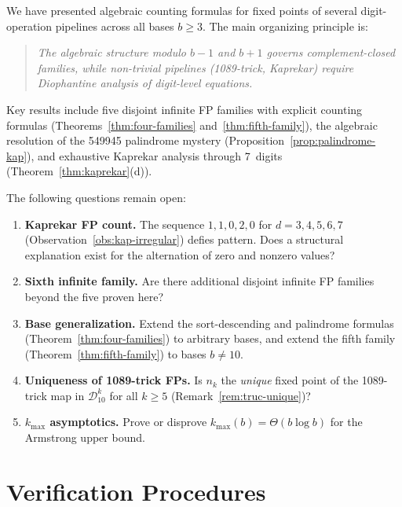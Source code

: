 \documentclass[11pt,a4paper]{amsart}
\theoremstyle{plain}
\theoremstyle{definition}
\theoremstyle{remark}
\begin{document}
We have presented algebraic counting formulas for fixed points of several
digit-operation pipelines across all bases $b \geq 3$. The main organizing
principle is:

\begin{quote}
\emph{The algebraic structure modulo $b{-}1$ and $b{+}1$ governs
complement-closed families, while non-trivial pipelines (1089-trick,
Kaprekar) require Diophantine analysis of digit-level equations.}
\end{quote}

Key results include five disjoint infinite FP families with explicit
counting formulas (Theorems~\ref{thm:four-families}
and~\ref{thm:fifth-family}), the algebraic resolution of the 549945
palindrome mystery (Proposition~\ref{prop:palindrome-kap}), and exhaustive
Kaprekar analysis through 7~digits (Theorem~\ref{thm:kaprekar}(d)).

The following questions remain open:

\begin{enumerate}
\item \textbf{Kaprekar FP count.} The sequence $1, 1, 0, 2, 0$ for
  $d = 3, 4, 5, 6, 7$ (Observation~\ref{obs:kap-irregular}) defies pattern.
  Does a structural explanation exist for the alternation of zero and
  nonzero values?
\item \textbf{Sixth infinite family.} Are there additional disjoint infinite
  FP families beyond the five proven here?
\item \textbf{Base generalization.} Extend the sort-descending and palindrome
  formulas (Theorem~\ref{thm:four-families}) to arbitrary bases, and extend
  the fifth family (Theorem~\ref{thm:fifth-family}) to bases $b \neq 10$.
\item \textbf{Uniqueness of 1089-trick FPs.} Is $n_k$ the \emph{unique}
  fixed point of the 1089-trick map in $\mathcal{D}_{10}^k$ for all
  $k \geq 5$ (Remark~\ref{rem:truc-unique})?
\item \textbf{$k_{\max}$ asymptotics.} Prove or disprove
  $k_{\max}(b) = \Theta(b \log b)$ for the Armstrong upper bound.
\end{enumerate}

\appendix
\section{Verification Procedures}\label{app:verification}
\end{document}
